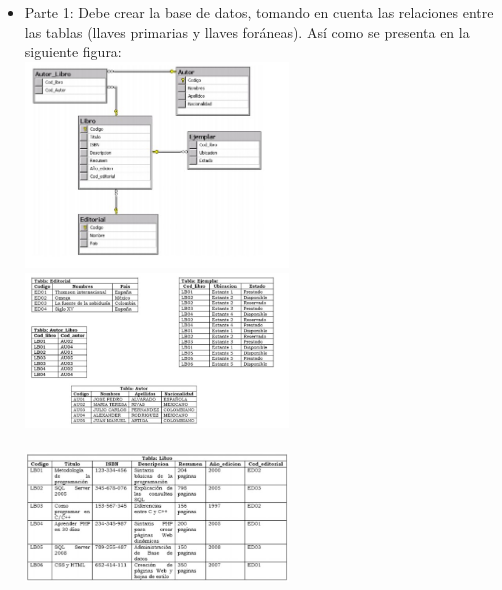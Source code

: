 \documentclass[preprint,12pt]{elsarticle}
\begin{document}
	\begin{itemize}
		
		\\ \item Parte 1: Debe crear la base de datos, tomando en cuenta las relaciones entre las
		tablas (llaves primarias y llaves foráneas). Así como se presenta en la siguiente
		figura:
		\\ \includegraphics[width=7cm]{./IMAGENES/P1.1} 
		 \includegraphics[width=7cm]{./IMAGENES/P1.2} \\
		\\ \includegraphics[width=7cm]{./IMAGENES/P1.3} \\
		

\end{itemize}
\end{document}
